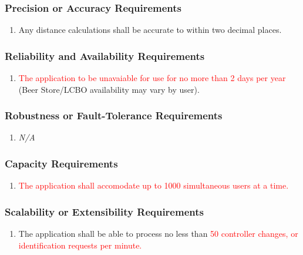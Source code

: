 \documentclass[]{article}
\begin{document}
\subsubsection{Precision or Accuracy Requirements}
\label{ssub:precision_or_accuracy_requirements}
\begin{enumerate}[{PR}1. ]
	\item Any distance calculations shall be accurate to within two decimal places.
\end{enumerate}

\subsubsection{Reliability and Availability Requirements}
\label{ssub:reliability_and_availability_requirements}
\begin{enumerate}[{PR}1. ]
	\item \textcolor{red}{The application to be unavaiable for use for no more than 2 days per year} (Beer Store/LCBO availability may vary by user).
\end{enumerate}

\subsubsection{Robustness or Fault-Tolerance Requirements}
\label{ssub:robustness_or_fault_tolerance_requirements}
\begin{enumerate}[{PR}1. ]
	\item \emph{N/A}
\end{enumerate}

\subsubsection{Capacity Requirements}
\label{ssub:capacity_requirements}
\begin{enumerate}[{PR}1. ]
	\item \textcolor{red}{The application shall accomodate up to 1000 simultaneous users at a time.}
\end{enumerate}

\subsubsection{Scalability or Extensibility Requirements}
\label{ssub:scalability_or_extensibility_requirements}
\begin{enumerate}[{PR}1. ]
	\item The application shall be able to process no less than \textcolor{red}{50 controller changes, or identification requests per minute.}
\end{enumerate}
\end{document}
